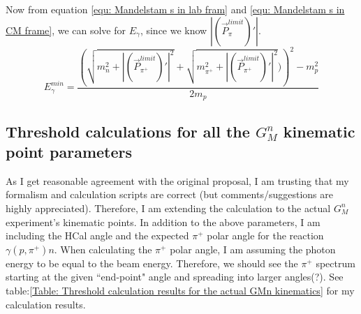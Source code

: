\documentclass[11pt,letterpaper]{article}
\begin{document}
Now from equation \ref{equ: Mandelstam s in lab fram} and \ref{equ: Mandelstam s in CM frame}, we can solve for $E_\gamma$, since we know $|(\vec{P}^{limit}_{\pi})'|$.
\begin{equation}
  E^{min}_\gamma  = \frac{ \left(\sqrt{m_n^2 + |(\vec{P}^{limit}_{\pi^+})'|^2} + \sqrt{m^2_{\pi^+} + |(\vec{P}^{limit}_{\pi^+})'|^2})\right)^2 - m_p^2}{2m_p}
\end{equation}

\subsection{Threshold calculations for all the $G_M^n$ kinematic point parameters}

As I get reasonable agreement with the original proposal, I am trusting that my formalism and calculation scripts are correct (but comments/suggestions are highly appreciated). Therefore, I am extending the calculation to the actual $G_M^n$ experiment's kinematic points. In addition to the above parameters, I am including the HCal angle and the expected $\pi^+$ polar angle for the reaction $\gamma(p,\pi^+)n$. When calculating the $\pi^+$ polar angle, I am assuming the photon energy to be equal to the beam energy. Therefore, we should see the $\pi^+$ spectrum starting at the given ``end-point" angle and spreading into larger angles(?). See table:\ref{Table: Threshold calculation results for the actual GMn kinematics} for my calculation results.
\end{document}
